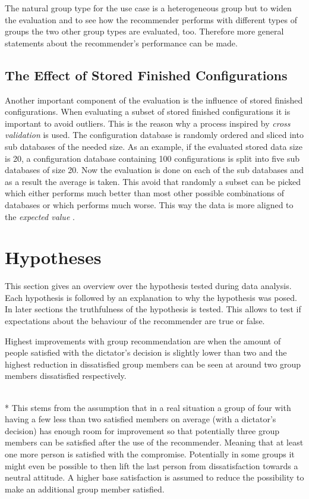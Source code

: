 The natural group type for the use case is a heterogeneous group but to widen the evaluation and to see how the recommender performs with different types of groups the two other group types are evaluated, too. Therefore more general statements about the recommender's performance can be made.

\subsection{The Effect of Stored Finished Configurations}

Another important component of the evaluation is the influence of stored finished configurations. When evaluating a subset of stored finished configurations it is important to avoid outliers. This is the reason why a process inspired by \emph{cross validation}  is used. The configuration database is randomly ordered and sliced into sub databases of the needed size. As an example, if the evaluated stored data size is 20, a configuration database containing 100 configurations is split into five sub databases of size 20. Now the evaluation is done on each of the sub databases and as a result the average is taken. This avoid that randomly a subset can be picked which either performs much better than most other possible combinations of databases or which performs much worse. This way the data is more aligned to the \emph{expected value} .


\section{Hypotheses}
\label{sec:Evaluation:Hypotheses}

This section gives an overview over the hypothesis tested during data analysis. Each hypothesis is followed by an explanation to why the hypothesis was posed. In later sections the truthfulness of the hypothesis is tested. This allows to test if expectations about the behaviour of the recommender are true or false.

\begin{hypothesis}
    \begin{itshape}
        \label{hyp:Evaluation:MaximumMinimum} Highest improvements with group recommendation are when the amount of people satisfied with the dictator's decision is slightly lower than two and the highest reduction in dissatisfied group members can be seen at around two group members dissatisfied respectively.
    \end{itshape} \medskip \\*    
    This stems from the assumption that in a real situation a group of four with having a few less than two satisfied members on average (with a dictator's decision) has enough room for improvement so that potentially three group members can be satisfied after the use of the recommender. Meaning that at least one more person is satisfied with the compromise. Potentially in some groups it might even be possible to then lift the last person from dissatisfaction towards a neutral attitude. A higher base satisfaction is assumed to reduce the possibility to make an additional group member satisfied.
\end{hypothesis}


